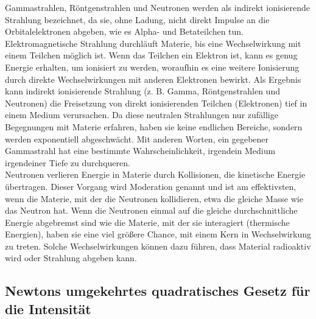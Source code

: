 Gammastrahlen, Röntgenstrahlen und Neutronen werden als indirekt ionisierende Strahlung bezeichnet, da sie, ohne Ladung, nicht direkt Impulse an die Orbitalelektronen abgeben, wie es Alpha- und Betateilchen tun. Elektromagnetische Strahlung durchläuft Materie, bis eine Wechselwirkung mit einem Teilchen möglich ist. Wenn das Teilchen ein Elektron ist, kann es genug Energie erhalten, um ionisiert zu werden, woraufhin es eine weitere Ionisierung durch direkte Wechselwirkungen mit anderen Elektronen bewirkt. Als Ergebnis kann indirekt ionisierende Strahlung (z. B. Gamma, Röntgenstrahlen und Neutronen) die Freisetzung von direkt ionisierenden Teilchen (Elektronen) tief in einem Medium verursachen. Da diese neutralen Strahlungen nur zufällige Begegnungen mit Materie erfahren, haben sie keine endlichen Bereiche, sondern werden exponentiell abgeschwächt. Mit anderen Worten, ein gegebener Gammastrahl hat eine bestimmte Wahrscheinlichkeit, irgendein Medium irgendeiner Tiefe zu durchqueren.\\
Neutronen verlieren Energie in Materie durch Kollisionen, die kinetische Energie übertragen. Dieser Vorgang wird Moderation genannt und ist am effektivsten, wenn die Materie, mit der die Neutronen kollidieren, etwa die gleiche Masse wie das Neutron hat. Wenn die Neutronen einmal auf die gleiche durchschnittliche Energie abgebremst sind wie die Materie, mit der sie interagiert (thermische Energien), haben sie eine viel größere Chance, mit einem Kern in Wechselwirkung zu treten. Solche Wechselwirkungen können dazu führen, dass Material radioaktiv wird oder Strahlung abgeben kann.
\subsection{Newtons umgekehrtes quadratisches Gesetz für die Intensität}

